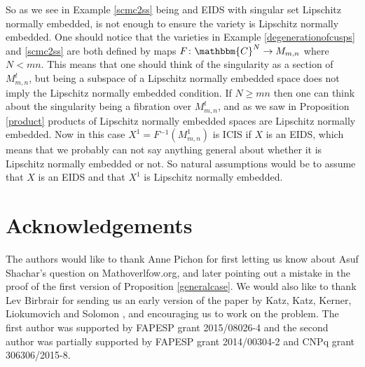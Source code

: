 \documentclass[a4paper,oneside]{amsart}
\theoremstyle{definition}
\begin{document}
So as we see in Example \ref{scmc2ss} being and EIDS with singular
set Lipschitz normally embedded, is not enough to ensure the variety is
Lipschitz normally embedded. One should notice that the varieties
in Example \ref{degenerationofcusps} and \ref{scmc2ss} are both
defined by maps ${ {F} \colon {{\mathbbm{C}}^N} \to {M_{m,n}}}$ where $N<mn$. This
means that one should think of the singularity as a section of
${M^{ {t} }_{m,n}}$, but being a subspace of a Lipschitz normally embedded space
does not imply the Lipschitz normally embedded condition. 
If $N\geq mn$ then 
one can think about the singularity being a fibration over ${M^{ {t} }_{m,n}}$,
and as we saw in Proposition \ref{product} products of Lipschitz
normally embedded spaces are Lipschitz normally embedded. Now in this
case $X^1=F{^{-1}}({M^{ {1} }_{m,n}})$ is ICIS if $X$ is an EIDS, which means that we
probably can not say anything general about whether it is Lipschitz
normally embedded or not. So natural assumptions would be to assume
that $X$ is an EIDS and that $X^1$ is Lipschitz normally embedded.

\section*{Acknowledgements}
The authors would like to thank Anne Pichon for first letting us know
about Asuf Shachar's question on Mathoverlfow.org, and later pointing
out a mistake in the proof of the first version of Proposition
\ref{generalcase}. We would also like to thank Lev Birbrair for
sending us an early version of the paper by Katz, Katz, Kerner,
Liokumovich and Solomon \cite{kerneretc}, and encouraging us to work on
the problem. The first author was supported by FAPESP grant
2015/08026-4 and the second author was partially supported by FAPESP
grant 2014/00304-2 and CNPq grant 306306/2015-8.
 


\end{document}

